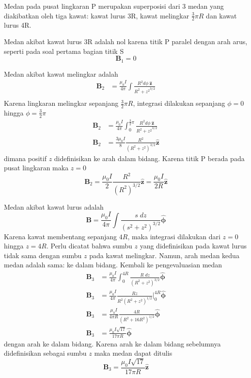 \documentclass[../../../main.tex]{subfiles}
\begin{document}
Medan pada pusat lingkaran P merupakan superposisi dari 3 medan yang diakibatkan oleh tiga kawat: kawat lurus 3R, kawat melingkar $\frac{3}{2}\pi R$ dan kawat lurus 4R.

Medan akibat kawat lurus 3R adalah nol karena titik P paralel dengan arah arus, seperti pada soal pertama bagian titik S
\begin{equation*}
    \mathbf{B}_1=0
\end{equation*}

Medan akibat kawat melingkar adalah
\begin{align*}
    \mathbf{B}_2&=\frac{\mu_0 I}{4\pi}\int \frac{R^2  d \phi \;\mathbf{\hat{z}}}{{R^2+z^2}^{3/2}}\\
\end{align*}
Karena lingkaran melingkar sepanjang $\frac{3}{2}\pi R$, integrasi dilakukan sepanjang $\phi=0$ hingga $\phi=\frac{3}{2}\pi $
\begin{align*}
    \mathbf{B}_2&=\frac{\mu_0 I}{4\pi}\int_{0}^{\frac{3}{2}\pi} \frac{R^2  d \phi \;\mathbf{\hat{z}}}{{R^2+z^2}^{3/2}}\\
    \mathbf{B}_2&=\frac{3\mu_0 I}{8}\frac{R^2}{(R^2+z^2)^{3/2}}\mathbf{\hat{z}}
\end{align*}
dimana positif $z$ didefinisikan ke arah dalam bidang. Karena titik P berada pada pusat lingkaran maka $z=0$ 
\begin{equation*}
    \mathbf{B}_2=\frac{\mu_0 I}{2}\frac{R^2}{(R^2)^{3/2}}\mathbf{\hat{z}}=\frac{\mu_0 I}{2R}\mathbf{\hat{z}}
\end{equation*}

Medan akibat kawat lurus adalah
\begin{equation*}
    \mathbf{B} =\frac{\mu_0 I}{4\pi}\int \frac{s\;dz}{(s^2+z^2)^{3/2}}\boldsymbol{\hat{\phi}}
\end{equation*}
Karena kawat membentang sepanjang $4R$, maka integrasi dilakukan dari $z=0$ hingga $z= 4R$. Perlu dicatat bahwa sumbu $z$ yang didefinisikan pada kawat lurus tidak sama dengan sumbu $z$ pada kawat melingkar. Namun, arah medan kedua medan adalah sama: ke dalam bidang. Kembali ke pengevaluasian medan 
\begin{align*}
    \mathbf{B}_3 &=\frac{\mu_0 I}{4\pi}\int_{0}^{4R} \frac{R\;dz}{(R^2+z^2)^{3/2}}\boldsymbol{\hat{\phi}}\\
    \mathbf{B}_3&=\frac{\mu_0 I}{4\pi}\frac{Rz}{R^2(R^2+z^2)^{1/2}}\bigg|_{0}^{4R}\boldsymbol{\hat{\phi}}\\
    \mathbf{B}_3&=\frac{\mu_0 I}{4\pi R}\frac{4R}{(R^2+16R^2)^{1/2}}\boldsymbol{\hat{\phi}}\\
    \mathbf{B}_3&=\frac{\mu_0 I\sqrt{17}}{17\pi R} \boldsymbol{\hat{\phi}}
\end{align*}
dengan arah ke dalam bidang. Karena arah ke dalam bidang sebelumnya didefinisikan sebagai sumbu $z$ maka medan dapat ditulis
\begin{equation*}
    \mathbf{B}_3=\frac{\mu_0 I\sqrt{17}}{17\pi R} \mathbf{\hat{z}}
\end{equation*}
\end{document}
